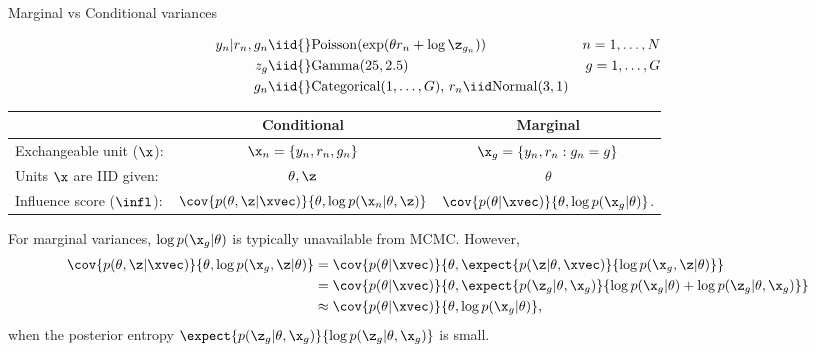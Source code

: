 \begin{frame}{Marginal vs Conditional variances}

\vspace{-1em}
\begin{align*}
%
y_n | r_n, g_n \iid{}& \mathrm{Poisson}(\exp(\theta r_n + \log \z_{g_n}))
    & n=1,\ldots,N\\
z_g \iid{}& \mathrm{Gamma}(25, 2.5) & g=1,\ldots,G\\
g_n \iid{}& \mathrm{Categorical}(1,\ldots,G)
\textrm{, }r_n \iid \mathrm{Normal}(3, 1)
%
\end{align*}
%

\begin{tabular}{|l|c|c|}
\hline
    & Conditional   & Marginal \\ \hline
Exchangeable unit ($\x$):
    & $\x_n = \{y_n, r_n, g_n\}$
    & $\x_g = \{y_n, r_n : g_n = g \}$\\ \hline
Units $\x$ are IID given:
    & $\theta, \z$
    & $\theta$ \\ \hline
Influence score ($\infl$):
    & $\cov{p(\theta, \z \vert \xvec)}{\theta, \log p(\x_n \vert \theta, \z)}$
    & $\cov{p(\theta \vert \xvec)}{\theta, \log p(\x_g \vert \theta)}$.\\ \hline
\end{tabular}

\pause
\vspace{1em}
For marginal variances, $\log p(\x_g \vert \theta)$ is typically unavailable
from MCMC.  \pause However,
%
\begin{align*}
%
\cov{p(\theta, \z \vert \xvec)}{\theta, \log p(\x_g, \z \vert \theta)}
={}&
\cov{p(\theta \vert \xvec)}
    {\theta, \expect{p(\z \vert \theta, \xvec)}
                    {\log p(\x_g, \z \vert \theta)}}
\\={}&
\cov{p(\theta \vert \xvec)}
    {\theta, \expect{p(\z_g \vert \theta, \x_g)}
                    {\log p(\x_g \vert \theta) +
                     \log p(\z_g \vert \theta, \x_g)}}
\\\approx{}&
\cov{p(\theta \vert \xvec)}{\theta, \log p(\x_g \vert \theta)},
%
\end{align*}
%
when the posterior entropy $\expect{p(\z_g \vert \theta, \x_g)}{\log p(\z_g
\vert \theta, \x_g)}$ is small.


\end{frame}
